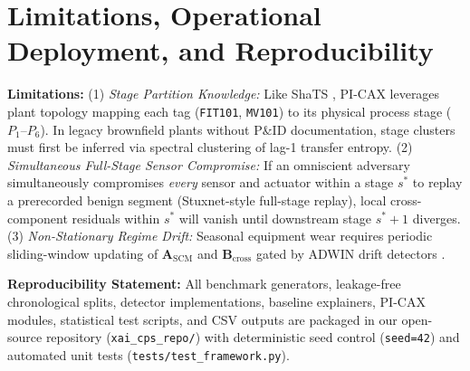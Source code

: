 \documentclass[10pt,a4paper]{article}
\begin{document}
\section{Limitations, Operational Deployment, and Reproducibility}

\textbf{Limitations:} (1) \emph{Stage Partition Knowledge:} Like ShaTS \cite{franco2026shats}, PI-CAX leverages plant topology mapping each tag (\texttt{FIT101}, \texttt{MV101}) to its physical process stage ($P_1\text{--}P_6$). In legacy brownfield plants without P\&ID documentation, stage clusters must first be inferred via spectral clustering of lag-1 transfer entropy. (2) \emph{Simultaneous Full-Stage Sensor Compromise:} If an omniscient adversary simultaneously compromises \emph{every} sensor and actuator within a stage $s^*$ to replay a prerecorded benign segment (Stuxnet-style full-stage replay), local cross-component residuals within $s^*$ will vanish until downstream stage $s^*+1$ diverges. (3) \emph{Non-Stationary Regime Drift:} Seasonal equipment wear requires periodic sliding-window updating of $\mathbf{A}_{\text{SCM}}$ and $\mathbf{B}_{\text{cross}}$ gated by ADWIN drift detectors \cite{skrodelis2026review}.

\textbf{Reproducibility Statement:} All benchmark generators, leakage-free chronological splits, detector implementations, baseline explainers, PI-CAX modules, statistical test scripts, and CSV outputs are packaged in our open-source repository (\texttt{xai\_cps\_repo/}) with deterministic seed control (\texttt{seed=42}) and automated unit tests (\texttt{tests/test\_framework.py}).
\end{document}
